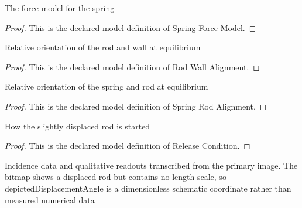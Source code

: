 \begin{definition}
  \label{def:physics:phyx-mini-0268:phyxminiproblems-problemphyxmini0268-springforcemodel}
  The force model for the spring
\end{definition}
\begin{proof}
  This is the declared model definition of Spring Force Model.
\end{proof}
\begin{definition}
  \label{def:physics:phyx-mini-0268:phyxminiproblems-problemphyxmini0268-rodwallalignment}
  Relative orientation of the rod and wall at equilibrium
\end{definition}
\begin{proof}
  This is the declared model definition of Rod Wall Alignment.
\end{proof}
\begin{definition}
  \label{def:physics:phyx-mini-0268:phyxminiproblems-problemphyxmini0268-springrodalignment}
  Relative orientation of the spring and rod at equilibrium
\end{definition}
\begin{proof}
  This is the declared model definition of Spring Rod Alignment.
\end{proof}
\begin{definition}
  \label{def:physics:phyx-mini-0268:phyxminiproblems-problemphyxmini0268-releasecondition}
  How the slightly displaced rod is started
\end{definition}
\begin{proof}
  This is the declared model definition of Release Condition.
\end{proof}
\begin{definition}
  \label{def:physics:phyx-mini-0268:phyxminiproblems-problemphyxmini0268-suppliedrodspringfigure}
  Incidence data and qualitative readouts transcribed from the primary image. The bitmap shows a displaced rod but contains no length scale, so depictedDisplacementAngle is a dimensionless schematic coordinate rather than measured numerical data
\end{definition}
